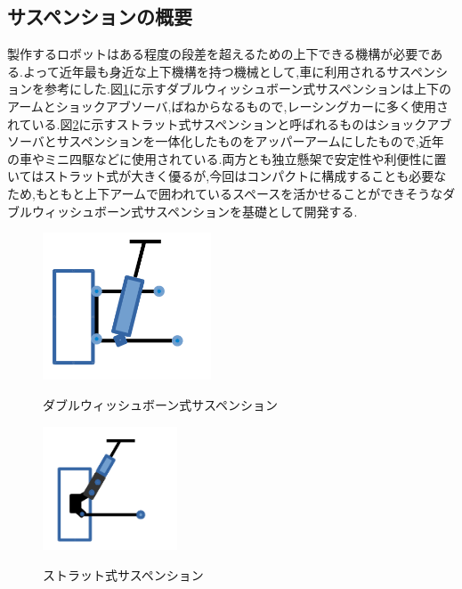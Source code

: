 \documentclass[12pt,oneside]{sotsuken_paper}
\begin{document}
\subsection{サスペンションの概要}
製作するロボットはある程度の段差を超えるための上下できる機構が必要である.よって近年最も身近な上下機構を持つ機械として,車に利用されるサスペンションを参考にした.図\ref{fig:doublewish}に示すダブルウィッシュボーン式サスペンションは上下のアームとショックアブソーバ,ばねからなるもので,レーシングカーに多く使用されている.図\ref{fig:strat}に示すストラット式サスペンションと呼ばれるものはショックアブソーバとサスペンションを一体化したものをアッパーアームにしたもので,近年の車やミニ四駆などに使用されている.両方とも独立懸架で安定性や利便性に置いてはストラット式が大きく優るが,今回はコンパクトに構成することも必要なため,もともと上下アームで囲われているスペースを活かせることができそうなダブルウィッシュボーン式サスペンションを基礎として開発する.

\begin{figure}[htp]
 \begin{center}
  \includegraphics[width=50mm]{img/hard/fig1.png}
 　\caption{ダブルウィッシュボーン式サスペンション}
  \label{fig:doublewish}%
 \end{center}
\end{figure}

\begin{figure}[htp]
 \begin{center}
  \includegraphics[width=40mm]{img/hard/fig2.png}
 　\caption{ストラット式サスペンション}
  \label{fig:strat}%
 \end{center}
\end{figure}
\end{document}
